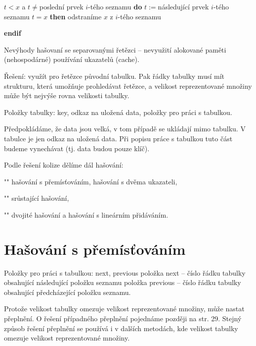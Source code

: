 \documentclass[a4paper,12pt]{article}
\begin{document}
\phantom{---}{\bf while} $t<x$ a $t\ne$poslední prvek $i$-tého seznamu {\bf do}\newline 
\phantom{------}$t:=$následující prvek $i$-tého seznamu\newline 
\phantom{---}{\bf enddo\newline 
endif\newline 
if} $t=x$ {\bf then} odstraníme $x$ z $i$-tého seznamu {\bf endif
\bigskip

}
Nevýhody hašovaní se separovanými řetězci --\newline 
\phantom{---}nevyužití alokované paměti (nehospodárné)\newline 
\phantom{---}používání ukazatelů (cache).\newline 

Řešení: využít pro řetězce původní tabulku. Pak řádky tabulky musí mít strukturu, která umožňuje prohledávat řetězce, a velikost reprezentované množiny 
může být nejvýše rovna velikosti tabulky.  

Položky tabulky:\newline 
\phantom{---}key,\newline 
\phantom{---}odkaz na uložená data,\newline 
\phantom{---}položky pro práci s tabulkou.

Předpokládáme, že data jsou velká, v tom případě se 
ukládají mimo tabulku. V tabulce je jen odkaz na uložená data. 
Při popisu práce s tabulkou tuto část budeme vynechávat (tj. 
data budou pouze klíč).

Podle řešení kolize dělíme dál hašování:
\roster
\item"{}"
hašování s přemís\v továním, hašování s dvěma 
ukazateli, 
\item"{}"
srůstající hašování,
\item"{}"
dvojité hašování a hašování s lineárním 
přidáváním.
\endroster

\section{Hašování s přemís\v továním}

Položky pro práci s tabulkou: next, previous\newline 
\phantom{---}položka next -- číslo řádku tabulky 
obsahující následující polož\-ku seznamu\newline 
\phantom{---}položka previous -- číslo řádku tabulky obsahující 
předcházející položku seznamu.

Protože velikost tabulky omezuje velikost reprezentované množiny, může nastat přeplnění. O řešení 
případného přeplnění pojednáme později na str. 29. Stejný způsob řešení přeplnění se používá i v dalších metodách, kde velikost tabulky omezuje velikost reprezentované množiny.
\end{document}
